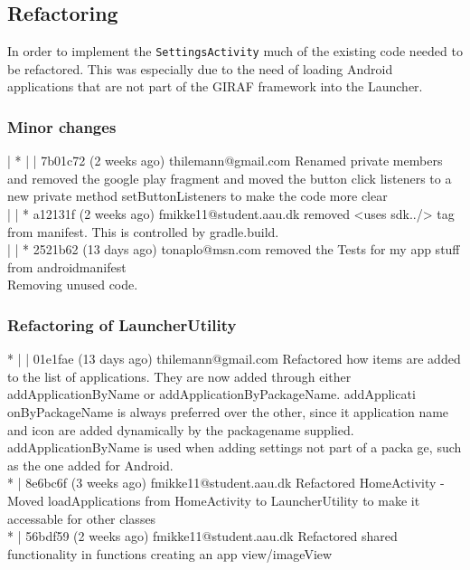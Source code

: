 \subsection{Refactoring}\label{sect:sprint3:refactoring}
In order to implement the \lstinline!SettingsActivity! much of the existing code needed to be refactored.
This was especially due to the need of loading Android applications that are not part of the GIRAF framework  into the Launcher. 

\subsubsection{Minor changes}
| * | | 7b01c72 (2 weeks ago) thilemann@gmail.com Renamed private members and removed the google play fragment and moved the button click listeners to a new private method setButtonListeners to make the code
 more clear\\
| | * a12131f (2 weeks ago) fmikke11@student.aau.dk removed <uses sdk../> tag from manifest. This is controlled by gradle.build.\\
| | * 2521b62 (13 days ago) tonaplo@msn.com removed the Tests for my app stuff from androidmanifest\\
 Removing unused code.\\
 
\subsubsection{Refactoring of LauncherUtility}
* | | 01e1fae (13 days ago) thilemann@gmail.com Refactored how items are added to the list of applications. They are now added through either addApplicationByName or addApplicationByPackageName. addApplicati
onByPackageName is always preferred over the other, since it application name and icon are added dynamically by the packagename supplied. addApplicationByName is used when adding settings not part of a packa
ge, such as the one added for Android.\\
* | 8e6bc6f (3 weeks ago) fmikke11@student.aau.dk Refactored HomeActivity - Moved loadApplications from HomeActivity to LauncherUtility to make it accessable for other classes\\
* | 56bdf59 (2 weeks ago) fmikke11@student.aau.dk Refactored shared functionality in functions creating an app view/imageView\\

